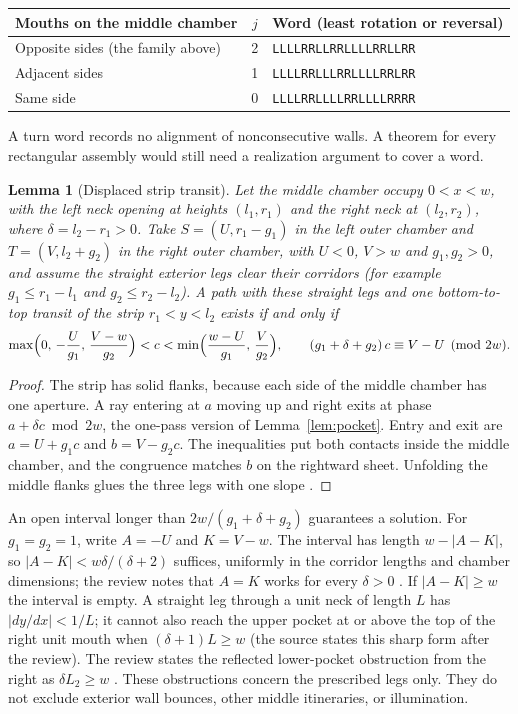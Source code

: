 \documentclass[11pt]{article}
\newtheorem{lemma}{Lemma}
\theoremstyle{definition}
\theoremstyle{remark}
\begin{document}
\begin{center}
\begin{tabular}{lcl}
\toprule
Mouths on the middle chamber & $j$ & Word (least rotation or reversal)\\
\midrule
Opposite sides (the family above) & 2 & \texttt{LLLLRRLLRRLLLLRRLLRR}\\
Adjacent sides & 1 & \texttt{LLLLRRLLLRRLLLLRRLRR}\\
Same side & 0 & \texttt{LLLLRRLLLLRRLLLLRRRR}\\
\bottomrule
\end{tabular}
\end{center}

A turn word records no alignment of nonconsecutive walls. A theorem for every
rectangular assembly would still need a realization argument to cover a word.

\begin{lemma}[Displaced strip transit]\label{lem:strip}
Let the middle chamber occupy $0<x<w$, with the left neck opening at heights
$(l_1,r_1)$ and the right neck at $(l_2,r_2)$, where $\delta=l_2-r_1>0$. Take
$S=(U,r_1-g_1)$ in the left outer chamber and $T=(V,l_2+g_2)$ in the right outer
chamber, with $U<0$, $V>w$ and $g_1,g_2>0$, and assume the straight exterior
legs clear their corridors (for example $g_1\le r_1-l_1$ and
$g_2\le r_2-l_2$). A path with these straight legs and one bottom-to-top
transit of the strip $r_1<y<l_2$ exists if and only if
\[
\max\Bigl(0,\,-\frac{U}{g_1},\,\frac{V-w}{g_2}\Bigr)<c<
\min\Bigl(\frac{w-U}{g_1},\,\frac{V}{g_2}\Bigr),\qquad
(g_1+\delta+g_2)\,c\equiv V-U\pmod{2w}.
\]
\end{lemma}

\begin{proof}
The strip has solid flanks, because each side of the middle chamber has one
aperture. A ray entering at $a$ moving up and right exits at phase
$a+\delta c\bmod 2w$, the one-pass version of Lemma~\ref{lem:pocket}. Entry and
exit are $a=U+g_1c$ and $b=V-g_2c$. The inequalities put both contacts inside
the middle chamber, and the congruence matches $b$ on the rightward sheet.
Unfolding the middle flanks glues the three legs with one slope
\cite{R3,d201}.
\end{proof}

An open interval longer than $2w/(g_1+\delta+g_2)$ guarantees a solution. For
$g_1=g_2=1$, write $A=-U$ and $K=V-w$. The interval has length $w-|A-K|$, so
$|A-K|<w\delta/(\delta+2)$ suffices, uniformly in the corridor lengths and chamber
dimensions; the review notes that $A=K$ works for every $\delta>0$ \cite{d201}.
If $|A-K|\ge w$ the interval is empty. A straight leg through a unit neck of
length $L$ has $|dy/dx|<1/L$; it cannot also reach the upper pocket at or above
the top of the right unit mouth when $(\delta+1)L\ge w$ (the source states this
sharp form after the review). The review states the reflected lower-pocket
obstruction from the right as $\delta L_2\ge w$ \cite{d201}. These obstructions
concern the prescribed legs only. They do not exclude exterior wall bounces,
other middle itineraries, or illumination.
\end{document}
